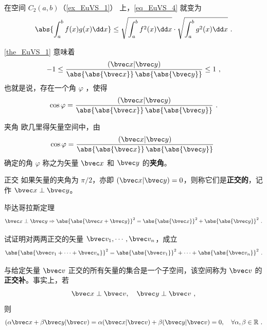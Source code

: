 \begin{example}{}
在空间 $C_2(a,b)$（\autoref{ex_EuVS_1}） 上，\autoref{eq_EuVS_4} 就变为
\begin{equation}
\abs{\int_a^b f(x)g(x)\dd x}\leq\sqrt{\int_a^b f^2(x)\dd x}\cdot\sqrt{\int_a^b g^2(x)\dd x}~.
\end{equation}
\end{example}
\autoref{the_EuVS_1} 意味着
\begin{equation}
-1\leq\frac{(\bvec x|\bvec y)}{\abs{\abs{\bvec x}}\,\abs{\abs{\bvec y}}}\leq1~,
\end{equation}
也就是说，存在一个角 $\varphi$ ，使得
\begin{equation}
\cos\varphi=\frac{(\bvec x|\bvec y)}{\abs{\abs{\bvec x}}\,\abs{\abs{\bvec y}}}~.
\end{equation}
\begin{definition}{夹角}\label{def_EuVS_3}
欧几里得矢量空间中，由
\begin{equation}
\cos\varphi=\frac{(\bvec x|\bvec y)}{\abs{\abs{\bvec x}}\,\abs{\abs{\bvec y}}}~
\end{equation}
确定的角 $\varphi$ 称之为矢量 $\bvec x$ 和 $\bvec y$ 的\textbf{夹角}。 
\end{definition}
\begin{definition}{正交}
如果矢量的夹角为 $\pi/2$，亦即 $(\bvec x|\bvec y)=0$，则称它们是\textbf{正交的}，记作 $\bvec x\perp\bvec y$。
\end{definition}
\begin{theorem}{毕达哥拉斯定理}
\begin{equation}
\bvec x\perp\bvec y\Rightarrow\abs{\abs{\bvec x+\bvec y}}^2=\abs{\abs{\bvec x}}^2+\abs{\abs{\bvec y}}^2~.
\end{equation}
\end{theorem}
\begin{exercise}{}
试证明对两两正交的矢量 $\bvec v_1,\cdots,\bvec v_n$，成立
\begin{equation}\label{eq_EuVS_5}
\abs{\abs{\bvec v_1+\cdots+\bvec v_n}}^2=\abs{\abs{\bvec v_1}}^2+\cdots+\abs{\abs{\bvec v_n}}^2~.
\end{equation}
\end{exercise}
\begin{example}{}
与给定矢量 $\bvec v$ 正交的所有矢量的集合是一个子空间，该空间称为 $\bvec v$ 的\textbf{正交补}。事实上，若
\begin{equation}
\bvec x\perp\bvec v,\quad\bvec y\perp\bvec v~,
\end{equation}
则
\begin{equation}
(\alpha\bvec x+\beta\bvec y|\bvec v)=\alpha(\bvec x|\bvec v)+\beta(\bvec y|\bvec v)=0,\quad \forall\alpha,\beta\in\mathbb R~.
\end{equation}
\end{example}
